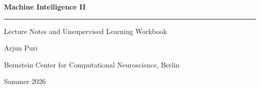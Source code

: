 \begin{titlepage}
  \centering
  \vspace*{3cm}

  {\sffamily\Huge\bfseries Machine Intelligence II}

  \vspace{0.6cm}
  {\rule{0.4\textwidth}{0.6pt}}

  \vspace{0.6cm}
  {\sffamily\Large Lecture Notes and Unsupervised Learning Workbook}

  \vspace{2.5cm}
  {\large Arjun Puri}

  \vspace{0.4cm}
  {\normalsize Bernstein Center for Computational Neuroscience, Berlin}

  \vfill

  {\small Summer 2026}

  \vspace{1cm}
\end{titlepage}
